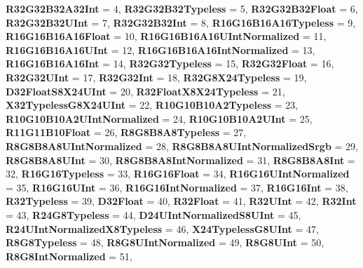 \begin{DoxyCompactItemize}
{\bfseries R32\+G32\+B32\+A32\+Int} = 4, 
{\bfseries R32\+G32\+B32\+Typeless} = 5, 
\newline
{\bfseries R32\+G32\+B32\+Float} = 6, 
{\bfseries R32\+G32\+B32\+U\+Int} = 7, 
{\bfseries R32\+G32\+B32\+Int} = 8, 
{\bfseries R16\+G16\+B16\+A16\+Typeless} = 9, 
\newline
{\bfseries R16\+G16\+B16\+A16\+Float} = 10, 
{\bfseries R16\+G16\+B16\+A16\+U\+Int\+Normalized} = 11, 
{\bfseries R16\+G16\+B16\+A16\+U\+Int} = 12, 
{\bfseries R16\+G16\+B16\+A16\+Int\+Normalized} = 13, 
\newline
{\bfseries R16\+G16\+B16\+A16\+Int} = 14, 
{\bfseries R32\+G32\+Typeless} = 15, 
{\bfseries R32\+G32\+Float} = 16, 
{\bfseries R32\+G32\+U\+Int} = 17, 
\newline
{\bfseries R32\+G32\+Int} = 18, 
{\bfseries R32\+G8\+X24\+Typeless} = 19, 
{\bfseries D32\+Float\+S8\+X24\+U\+Int} = 20, 
{\bfseries R32\+Float\+X8\+X24\+Typeless} = 21, 
\newline
{\bfseries X32\+Typeless\+G8\+X24\+U\+Int} = 22, 
{\bfseries R10\+G10\+B10\+A2\+Typeless} = 23, 
{\bfseries R10\+G10\+B10\+A2\+U\+Int\+Normalized} = 24, 
{\bfseries R10\+G10\+B10\+A2\+U\+Int} = 25, 
\newline
{\bfseries R11\+G11\+B10\+Float} = 26, 
{\bfseries R8\+G8\+B8\+A8\+Typeless} = 27, 
{\bfseries R8\+G8\+B8\+A8\+U\+Int\+Normalized} = 28, 
{\bfseries R8\+G8\+B8\+A8\+U\+Int\+Normalized\+Srgb} = 29, 
\newline
{\bfseries R8\+G8\+B8\+A8\+U\+Int} = 30, 
{\bfseries R8\+G8\+B8\+A8\+Int\+Normalized} = 31, 
{\bfseries R8\+G8\+B8\+A8\+Int} = 32, 
{\bfseries R16\+G16\+Typeless} = 33, 
\newline
{\bfseries R16\+G16\+Float} = 34, 
{\bfseries R16\+G16\+U\+Int\+Normalized} = 35, 
{\bfseries R16\+G16\+U\+Int} = 36, 
{\bfseries R16\+G16\+Int\+Normalized} = 37, 
\newline
{\bfseries R16\+G16\+Int} = 38, 
{\bfseries R32\+Typeless} = 39, 
{\bfseries D32\+Float} = 40, 
{\bfseries R32\+Float} = 41, 
\newline
{\bfseries R32\+U\+Int} = 42, 
{\bfseries R32\+Int} = 43, 
{\bfseries R24\+G8\+Typeless} = 44, 
{\bfseries D24\+U\+Int\+Normalized\+S8\+U\+Int} = 45, 
\newline
{\bfseries R24\+U\+Int\+Normalized\+X8\+Typeless} = 46, 
{\bfseries X24\+Typeless\+G8\+U\+Int} = 47, 
{\bfseries R8\+G8\+Typeless} = 48, 
{\bfseries R8\+G8\+U\+Int\+Normalized} = 49, 
\newline
{\bfseries R8\+G8\+U\+Int} = 50, 
{\bfseries R8\+G8\+Int\+Normalized} = 51, 

\end{DoxyCompactItemize}
